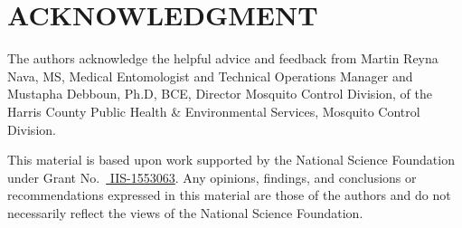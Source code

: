 \documentclass[letterpaper, 10 pt, conference]{ieeeconf}  %
\begin{document}


%

\section*{ACKNOWLEDGMENT}
The authors acknowledge the helpful advice and feedback from Martin Reyna Nava, MS, Medical Entomologist and Technical Operations Manager and Mustapha Debboun, Ph.D, BCE, Director Mosquito Control Division, of the Harris County Public Health \& Environmental Services, Mosquito Control Division.

This material is based upon work supported by the National Science Foundation under Grant No.\ 
\href{http://nsf.gov/awardsearch/showAward?AWD_ID=1553063}{ IIS-1553063}.
Any opinions, findings, and conclusions or recommendations expressed in this material are those of the authors and do not necessarily reflect the views of the National Science Foundation.





%

%
%
%
%
%
%
\end{document}
